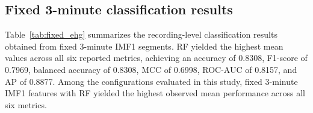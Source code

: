\documentclass[10pt,letterpaper]{article}
\begin{document}
\subsection*{Fixed 3-minute classification results}

Table~\ref{tab:fixed_ehg} summarizes the recording-level classification results obtained from fixed 3-minute IMF1 segments. RF yielded the highest mean values across all six reported metrics, achieving an accuracy of 0.8308, F1-score of 0.7969, balanced accuracy of 0.8308, MCC of 0.6998, ROC-AUC of 0.8157, and AP of 0.8877. Among the configurations evaluated in this study, fixed 3-minute IMF1 features with RF yielded the highest observed mean performance across all six metrics.

\begin{table}[!htbp]
\centering
\caption{\textbf{Recording-level performance for fixed 3-minute segmentation using EHG-only IMF1 features.} Values are means across 30 complete repetition-level out-of-fold evaluations. Preterm delivery was treated as the positive class.}
\label{tab:fixed_ehg}
\end{table}
\FloatBarrier
 
\end{document}
